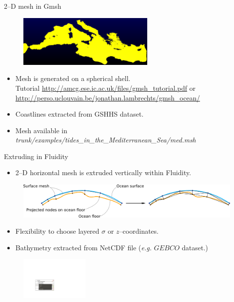 \documentclass[t]{beamer}
\begin{document}
\begin{frame}{2--D mesh in Gmsh}

\begin{figure}[htbp!]
 \centering
  \includegraphics[width=0.6\textwidth]{figures/med_mesh2}
\end{figure}
\begin{itemize}
\item Mesh is generated on a spherical shell.
\\ Tutorial {\footnotesize \url{http://amcg.ese.ic.ac.uk/files/gmsh\_tutorial.pdf}} or \\ {\footnotesize \url{http://perso.uclouvain.be/jonathan.lambrechts/gmsh_ocean/}}
\item Coastlines extracted from GSHHS dataset.
\item Mesh available in {\it trunk/examples/tides\_in\_the\_Mediterranean\_Sea/med.msh}
\end{itemize}

\end{frame}

\begin{frame}{Extruding in Fluidity}
\begin{itemize}
\item 2--D horizontal mesh is extruded vertically within Fluidity.
\end{itemize}
\begin{figure}[htbp!]
 \centering
  \includegraphics[width=1.0\textwidth]{figures/mesh_extrusion.png}
\end{figure}
\begin{itemize}
\item Flexibility to choose layered $\sigma$ or $z$--coordinates.
\item Bathymetry extracted from NetCDF file ({\it e.g.} $GEBCO$ dataset.)
\end{itemize}

\begin{figure}[htbp!]
 \centering
  \includegraphics[width=0.3\textwidth]{figures/extrude}
\end{figure}

\end{frame}
\end{document}
